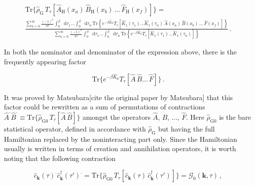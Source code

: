\documentclass[12pt]{report}
\renewcommand{\vec}[1]{\boldsymbol{\mathbf{#1}}}                        %
\newcommand*\diff{\mathop{}\!\mathrm{d}}
\newcommand{\Gt}{\mathcal{G}}
\newcommand{\todo}[1]{{\leavevmode\color{todo}#1}}
\begin{document}
\begin{equation}
	\label{eq:perturbationSeries}
	\begin{split}
		\text{Tr} \{ \hat \rho_\text{G} \, T_\tau [\hat A_\text{H}(x_a) \, \hat B_\text{H}(x_b) \, \dots \, \hat F_\text{H}(x_f) ] \}
		= \\
		\frac{
			\sum_{n=0}^\infty \frac{(-1)^n}{n!} \int_0^\beta \diff \tau_1 \dots \int_0^\beta \diff \tau_n \, 
			\text{Tr} \left\{ e^{- \beta \hat K_0} T_\tau [\hat K_1 (\tau_1) \dots \hat K_1 (\tau_n) \, \hat A(x_a) \, \hat B(x_b) \, \dots \, \hat F(x_f)] \right\}
		}{
			\sum_{n=0}^\infty \frac{(-1)^n}{n!} \int_0^\beta \diff \tau_1 \dots \int_0^\beta \diff \tau_n \,
			\text{Tr} \left\{ e^{- \beta \hat K_0} T_\tau [\hat K_1 (\tau_1) \dots \hat K_1 (\tau_n)] \right\}
		} \,.
	\end{split}
\end{equation}



In both the nominator and denominator of the expression above, there is the frequently appearing factor

\begin{equation}
	\label{eq:bareStatcalEnsembleAverage}
	\text{Tr} \{ e^{-\beta \hat K_0 } T_\tau [ \hat A \, \hat B \dots\,  \hat F] \} \,.
\end{equation}

It was proved by Matsubara\todo{[cite the original paper by Matsubara]} that this factor could be rewritten as a sum of permutations of contractions $ \hat A^\cdot \hat B^\cdot \equiv \text{Tr} \{ \hat \rho_{\text{G}0} \, T_\tau [ \hat A \,\hat B ] \} $ amongst the operators $ \hat A, \, \hat B, \, \dots , \, \hat F $. Here $ \hat \rho_{\text{G}0} $ is the bare statistical operator, defined in accordance with $ \hat \rho_\text{G} $ but having the full Hamiltonian replaced by the noninteracting part only. Since the Hamiltonian usually is written in terms of creation and annihilation operators, it is worth noting that the following contraction

\begin{equation}
	\hat c_{\vec k} (\tau) ^\cdot \hat c^\dagger_{\vec k} (\tau') ^\cdot
	= \text{Tr} \{ \hat \rho_{\text{G}0} \, T_\tau [ \hat c_{\vec k} (\tau) \, \hat c^\dagger_{\vec k} (\tau') ] \}
	= \Gt_0(\vec k, \tau) \,,
\end{equation}
\end{document}
